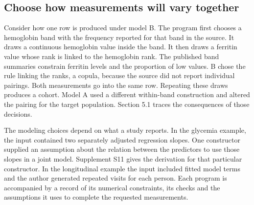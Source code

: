 \documentclass[sigconf,review]{acmart}
\begin{document}
\subsection{Choose how measurements will vary together}

Consider how one row is produced under model B. The program first chooses a hemoglobin band with the frequency reported for that band in the source. It draws a continuous hemoglobin value inside the band. It then draws a ferritin value whose rank is linked to the hemoglobin rank. The published band summaries constrain ferritin levels and the proportion of low values. B chose the rule linking the ranks, a copula, because the source did not report individual pairings. Both measurements go into the same row. Repeating these draws produces a cohort. Model A used a different within-band construction and altered the pairing for the target population. Section 5.1 traces the consequences of those decisions.


The modeling choices depend on what a study reports. In the glycemia example, the input contained two separately adjusted regression slopes. One constructor supplied an assumption about the relation between the predictors to use those slopes in a joint model. Supplement S11 gives the derivation for that particular constructor. In the longitudinal example the input included fitted model terms and the author generated repeated visits for each person. Each program is accompanied by a record of its numerical constraints, its checks and the assumptions it uses to complete the requested measurements.
\end{document}
